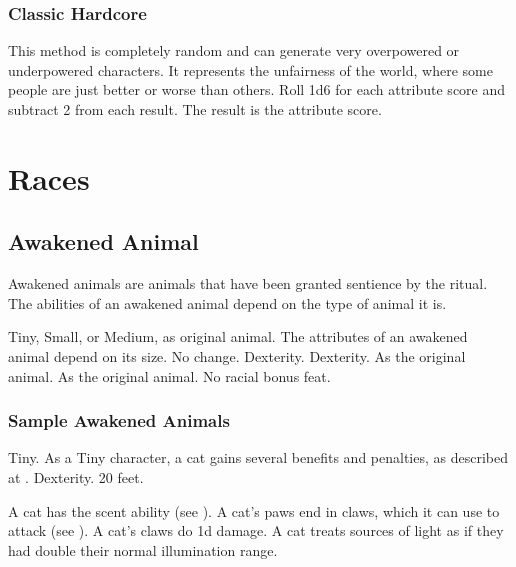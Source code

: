         \subsubsection{Classic Hardcore}

            This method is completely random and can generate very overpowered or underpowered characters. It represents the unfairness of the world, where some people are just better or worse than others. Roll 1d6 for each attribute score and subtract 2 from each result. The result is the attribute score.

\newpage

\section{Races}

    \subsection{Awakened Animal}

        Awakened animals are animals that have been granted sentience by the  ritual.
        The abilities of an awakened animal depend on the type of animal it is.

         Tiny, Small, or Medium, as original animal.
         The attributes of an awakened animal depend on its size.
         No change.
          Dexterity.
          Dexterity.
         As the original animal.
         As the original animal.
         No racial bonus feat.

        \subsubsection{Sample Awakened Animals}


             Tiny. As a Tiny character, a cat gains several benefits and penalties, as described at .
              Dexterity.
             20 feet.
            \begin{itemize}
                 A cat has the scent ability (see ).
                 A cat's paws end in claws, which it can use to attack (see ). A cat's claws do \minus1d damage.
                 A cat treats sources of light as if they had double their normal illumination range.
            \end{itemize}

